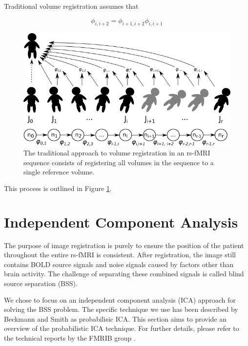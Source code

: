 \noindent Traditional volume registration assumes that 

\begin{equation}
\phi_{i,i+2} = \phi_{i+1,i+2} \phi_{i,i+1}
\end{equation}

\begin{figure}
\centering
\includegraphics[width=.7\textwidth]{3/dag-registration.png}
\caption{The traditional approach to volume registration in an rs-fMRI sequence consists of registering all volumes in the sequence to a single reference volume.}
\label{ch3:fig:dag-reg}
\end{figure}

 This process is outlined in Figure \ref{ch3:fig:dag-reg}.

\section{Independent Component Analysis}

The purpose of image registration is purely to ensure the position of the patient throughout the entire rs-fMRI is consistent. After registration, the image still contains BOLD source signals and noise signals caused by factors other than brain activity. The challenge of separating these combined signals is called blind source separation (BSS). 

We chose to focus on an independent component analysis (ICA) approach for solving the BSS problem. The specific technique we use has been described by Beckmann and Smith as probabilisic ICA. This section aims to provide an overview of the probabilistic ICA technique. For further details, please refer to the technical reports by the FMRIB group \cite{Beckmann2004} \cite{Woolrich2004} \cite{Beckmann} \cite{Smith2004}.

